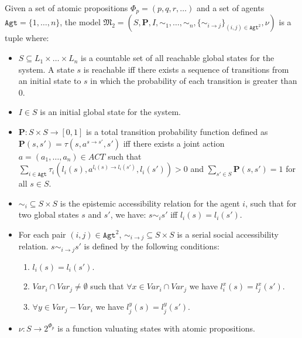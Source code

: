 \begin{definition}[Models]\label{def:models-pctlkc}

Given a set of atomic propositions $\Phi_p = (p,q,r, \ldots)$ and a set of agents $\texttt{Agt}=\{1,\ldots,n\}$,  the model $\mathfrak{M_2}=(S,\textbf{P},I,\sim_1, \ldots
,\sim_n,\{\sim_{i \rightarrow j}\}_{{(i,j)}\in \texttt{Agt}^2},\nu)$ is a tuple where:
%
\begin{itemize}
\item  $S \subseteq L_1 \times \ldots \times L_n$ is a countable
set of all reachable global states for the system. A state $s$ is
reachable iff there exists a sequence of transitions from an
initial state to $s$ in which the probability of each transition
is greater than $0$.

\item  $I \in S$ is an initial global state for the system.


\item  $\textbf{P}:S\times S\rightarrow [0,1]$ is a total
transition probability function defined as $\textbf{P}(s,
s')=\tau(s,a^{s \rightarrow s'}, s')$ iff there exists a joint
action $a=(a_1,\ldots,a_n) \in ACT$ such that\\
 $\sum_{i \in \texttt{Agt}} \tau_i(l_i(s),a^{l_i(s)\rightarrow l_i(s')},l_i(s')) > 0$ and $\sum_{s' \in S} \textbf{P}(s,s') =1$
for all $s \in S$.

\item  $\sim_i \subseteq S \times S$ is the epistemic
  accessibility relation for the agent $i$, such that for two global states $s$ and $s'$, we have: $s \sim_i s'$ iff
  $l_i(s)=l_i(s')$.

\item For each pair $(i,j) \in \texttt{Agt}^2$,
$\sim_{i\rightarrow j} \subseteq S \times S$ is a serial social
accessibility relation. $s \sim_{i\rightarrow j} s'$ is defined by
the following conditions:
  \begin{enumerate}
       \item $l_i(s)=l_i(s')$.
       \item $Var_i \cap Var_j \neq \emptyset$ such that $\forall x \in Var_i \cap Var_j$ we have $l^{x}_i(s)\!=\!l^{x}_j(s')$.
       \item $\forall y \in Var_j\!-\! Var_i$ we have $l^{y}_j(s)\!=\!l^{y}_j(s')$.
  \end{enumerate}
  \item  $\nu : S\rightarrow 2^{\Phi_p}$ is a function valuating states with atomic propositions.
\end{itemize}
\end{definition}
%



